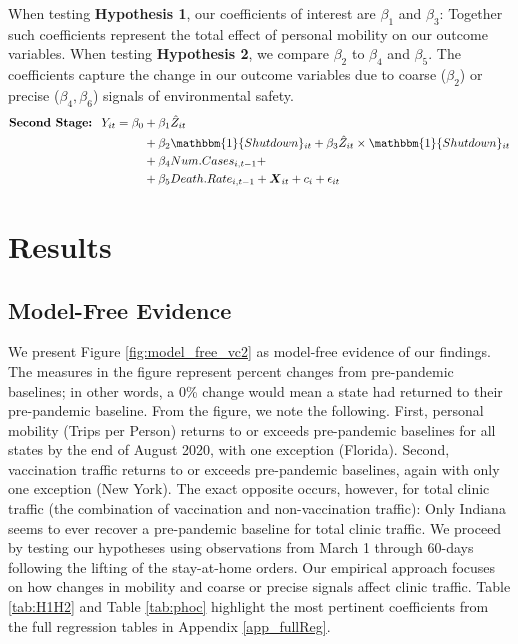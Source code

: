  When testing \textbf{Hypothesis 1}, our coefficients of interest are $\beta_1$ and $\beta_3$: Together such coefficients represent the total effect of personal mobility on our outcome variables. When testing \textbf{Hypothesis 2}, we compare $\beta_2$ to $\beta_4$ and $\beta_5$. The coefficients capture the change in our outcome variables due to coarse ($\beta_2$) or precise ($\beta_4,\beta_6$) signals of environmental safety. 
 \begin{equation} \begin{split} \label{spec_2sls}
     \textbf{Second Stage: \:}  Y_{it} = \beta_0 & + \beta_1 \hat{Z}_{it} \\ & + \beta_2 \mathbbm{1}\{Shutdown\}_{it} + \beta_3 \hat{Z}_{it} \times \mathbbm{1}\{Shutdown\}_{it} \\ & + \beta_4 Num.Cases_{i,t-1} + \\ & + \beta_5 Death.Rate_{i,t-1} + \boldsymbol{X}_{it} + c_i + \epsilon_{it} 
 \end{split} \end{equation}
 
 
\section{Results} \label{Results_VC2}
 \subsection{Model-Free Evidence}
 We present Figure \ref{fig:model_free_vc2} as model-free evidence of our findings. The measures in the figure represent percent changes from pre-pandemic baselines; in other words, a 0\% change would mean a state had returned to their pre-pandemic baseline. From the figure, we note the following. First, personal mobility (Trips per Person) returns to or exceeds pre-pandemic baselines for all states by the end of August 2020, with one exception (Florida). Second, vaccination traffic returns to or exceeds pre-pandemic baselines, again with only one exception (New York). The exact opposite occurs, however, for total clinic traffic (the combination of vaccination and non-vaccination traffic): Only Indiana seems to ever recover a pre-pandemic baseline for total clinic traffic. We proceed by testing our hypotheses using observations from March 1 through 60-days following the lifting of the stay-at-home orders. Our empirical approach focuses on how changes in mobility and coarse or precise signals affect clinic traffic. Table \ref{tab:H1H2} and Table \ref{tab:phoc} highlight the most pertinent coefficients from the full regression tables in Appendix \ref{app_fullReg}.
 
